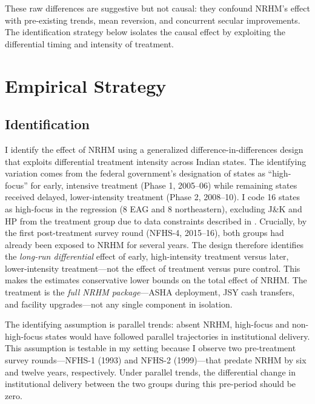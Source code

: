 \documentclass[12pt]{article}
\begin{document}
These raw differences are suggestive but not causal: they confound NRHM's effect with pre-existing trends, mean reversion, and concurrent secular improvements. The identification strategy below isolates the causal effect by exploiting the differential timing and intensity of treatment.


\section{Empirical Strategy}
\label{sec:strategy}

\subsection{Identification}

I identify the effect of NRHM using a generalized difference-in-differences design that exploits differential treatment intensity across Indian states. The identifying variation comes from the federal government's designation of states as ``high-focus'' for early, intensive treatment (Phase 1, 2005--06) while remaining states received delayed, lower-intensity treatment (Phase 2, 2008--10). I code 16 states as high-focus in the regression (8 EAG and 8 northeastern), excluding J\&K and HP from the treatment group due to data constraints described in . Crucially, by the first post-treatment survey round (NFHS-4, 2015--16), both groups had already been exposed to NRHM for several years. The design therefore identifies the \emph{long-run differential} effect of early, high-intensity treatment versus later, lower-intensity treatment---not the effect of treatment versus pure control. This makes the estimates conservative lower bounds on the total effect of NRHM. The treatment is the \emph{full NRHM package}---ASHA deployment, JSY cash transfers, and facility upgrades---not any single component in isolation.

The identifying assumption is parallel trends: absent NRHM, high-focus and non-high-focus states would have followed parallel trajectories in institutional delivery. This assumption is testable in my setting because I observe two pre-treatment survey rounds---NFHS-1 (1993) and NFHS-2 (1999)---that predate NRHM by six and twelve years, respectively. Under parallel trends, the differential change in institutional delivery between the two groups during this pre-period should be zero.
\end{document}
